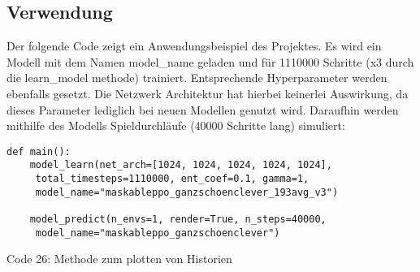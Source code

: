 \subsection{Verwendung}
\begin{minipage}{\linewidth}
Der folgende Code zeigt ein Anwendungsbeispiel des Projektes. Es  wird ein Modell mit dem Namen model\_name geladen und für 1110000 Schritte (x3 durch die learn\_model methode) trainiert. Entsprechende Hyperparameter werden ebenfalls gesetzt. Die Netzwerk Architektur hat hierbei keinerlei Auswirkung, da dieses Parameter lediglich bei neuen Modellen genutzt wird. Daraufhin werden mithilfe des Modells Spieldurchläufe (40000 Schritte lang) simuliert:
\vspace{0.5cm}
\begin{lstlisting}
def main():
	model_learn(net_arch=[1024, 1024, 1024, 1024, 1024],
	 total_timesteps=1110000, ent_coef=0.1, gamma=1, 
	 model_name="maskableppo_ganzschoenclever_193avg_v3")
	
	model_predict(n_envs=1, render=True, n_steps=40000,
	 model_name="maskableppo_ganzschoenclever")
\end{lstlisting}
Code 26: Methode zum plotten von Historien\\
\end{minipage}